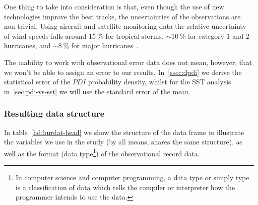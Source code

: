 One thing to take into consideration is that, even though the use of new technologies improve the best tracks, the uncertainties of the observations are non-trivial. Using aircraft and satellite monitoring data the relative uncertainty of wind speeds falls around $\SI{15}{\percent}$ for tropical storms, $\sim\SI{10}{\percent}$ for category 1 and 2 hurricanes, and $\sim\SI{8}{\percent}$ for major hurricanes~\cite{Landsea2013}.

The inability to work with observational error data does not mean, however, that we won't be able to assign an error to our results. In~\cref{ssec:dpdi} we derive the statistical error of the $PDI$ probability density, whilst for the SST analysis in~\cref{sec:pdi-vs-sst} we will use the standard error of the mean.

\subsubsection{Resulting data structure}
In table~\ref{hd:hurdat-head} we show the structure of the  data frame to illustrate the variables we use in the study (by all means,  shares the same structure), as well as the format (data type\footnote{In computer science and computer programming, a data type or simply type is a classification of data which tells the compiler or interpreter how the programmer intends to use the data. }) of the observational record data.
\begin{table}[H]
	\centering
	\ttfamily
	\caption{Excerpt of the  data frame}
	\label{hd:hurdat-head}
\end{table}

